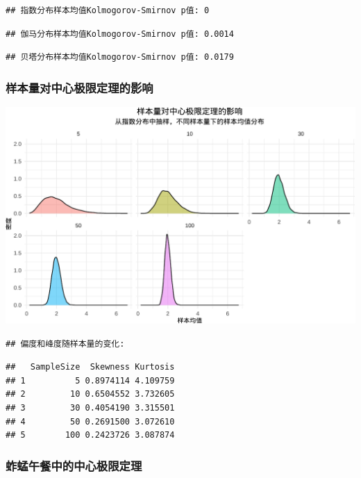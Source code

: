 \documentclass[
]{book}
\begin{document}
\begin{verbatim}
## 指数分布样本均值Kolmogorov-Smirnov p值: 0
\end{verbatim}

\begin{verbatim}
## 伽马分布样本均值Kolmogorov-Smirnov p值: 0.0014
\end{verbatim}

\begin{verbatim}
## 贝塔分布样本均值Kolmogorov-Smirnov p值: 0.0179
\end{verbatim}

\hypertarget{ux6837ux672cux91cfux5bf9ux4e2dux5fc3ux6781ux9650ux5b9aux7406ux7684ux5f71ux54cd}{%
\subsubsection{样本量对中心极限定理的影响}\label{ux6837ux672cux91cfux5bf9ux4e2dux5fc3ux6781ux9650ux5b9aux7406ux7684ux5f71ux54cd}}

\begin{center}\includegraphics[width=0.8\linewidth]{ecological-statistics_files/figure-latex/unnamed-chunk-33-1} \end{center}

\begin{verbatim}
## 偏度和峰度随样本量的变化:
\end{verbatim}

\begin{verbatim}
##   SampleSize  Skewness Kurtosis
## 1          5 0.8974114 4.109759
## 2         10 0.6504552 3.732605
## 3         30 0.4054190 3.315501
## 4         50 0.2691500 3.072610
## 5        100 0.2423726 3.087874
\end{verbatim}

\hypertarget{ux86b1ux8722ux5348ux9910ux4e2dux7684ux4e2dux5fc3ux6781ux9650ux5b9aux7406}{%
\subsubsection{蚱蜢午餐中的中心极限定理}\label{ux86b1ux8722ux5348ux9910ux4e2dux7684ux4e2dux5fc3ux6781ux9650ux5b9aux7406}}
\end{document}
